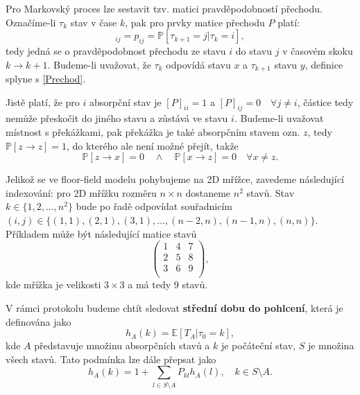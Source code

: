 \documentclass[a4paper, 12pt, fleqn]{article}
\begin{document}
	Pro Markovský proces lze sestavit tzv. matici pravděpodobností přechodu. Označíme-li $\tau_k$ stav v čase $k$, pak pro prvky matice přechodu $P$ platí:
	\begin{equation}
	[P]_{ij} = p_{ij} = \mathbb{P} [\tau_{k+1} = j | \tau_k = i],
	\end{equation}
	tedy jedná se o pravděpodobnost přechodu ze stavu $i$ do stavu $j$ v časovém skoku $k \rightarrow k + 1$. Budeme-li uvažovat, že $\tau_k$ odpovídá stavu $x$ a $\tau_{k+1}$ stavu $y$, definice splyne s \eqref{Prechod}.
	
	Jistě platí, že pro $i$ absorpční stav je $[P]_{ii} = 1$ a $[P]_{ij} = 0 \quad \forall j \neq i$, částice tedy nemůže přeskočit do jiného stavu a zůstává ve stavu $i$. Budeme-li uvažovat místnost s překážkami, pak překážka je také absorpčním stavem ozn. $z$, tedy $\mathbb{P}[z \rightarrow z] = 1$, do kterého ale není možné přejít, takže
	\[
	\mathbb{P}[z \rightarrow x] = 0 \quad \land \quad \mathbb{P}[x \rightarrow z] = 0 \quad  \forall x \neq z.
	\]
	
	Jelikož se ve floor-field modelu pohybujeme na 2D mřížce, zavedeme následující indexování: pro 2D mřížku rozměru $n \times n$ dostaneme $n^2$ stavů. Stav $k \in \{1,2,\dots,n^2\}$ bude po řadě odpovídat souřadnicím $(i,j) \in \{ (1,1),(2,1),(3,1),\dots,(n-2,n),(n-1,n),(n,n) \}$. Příkladem může být následující matice stavů
	\begin{equation*}
	\begin{pmatrix}
	1 & 4 & 7 \\
	2 & 5 & 8 \\
	3 & 6 & 9 \\
	\end{pmatrix},
	\end{equation*}
	kde mřížka je velikosti $3 \times 3$ a má tedy 9 stavů.
	
	V rámci protokolu budeme chtít sledovat \textbf{střední dobu do pohlcení}, která je definována jako
	\begin{equation}
	h_A(k) = \mathbb{E} \left[ T_A | \tau_0 = k \right],
	\end{equation}
	kde $A$ představuje množinu absorpčních stavů a $k$ je počáteční stav, $S$ je množina všech stavů. Tato podmínka lze dále přepsat jako
	\begin{equation}
	h_A(k) = 1 + \sum_{l \in S \setminus A} P_{kl} h_A(l), \quad k \in S \setminus A.
	\end{equation}
	
\end{document}
